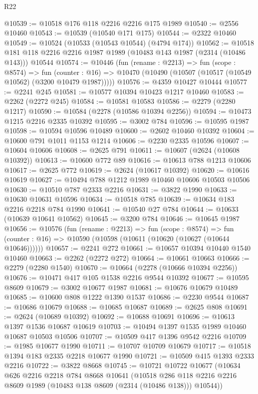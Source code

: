 \begin{lexlean}{R22}
\begin{coremodule}
@10539 := @10518 @176 @118 @2216 @2216 @175 @1989
@10540 := @2556 @10460
@10543 := @10539 (@10540 @171 @175)
@10544 := @2322 @10460
@10549 := @10524 (@10533 (@10543 @10544) (@4794 @174))
@10562 := @10518 @181 @118 @2216 @2216 @1987 @1989 (@10483 @143 @1987 (@2314 (@10486 @143))) @10544
@10574 := @10446
    (fun (rename : @2213) =>
    fun (scope : @8574) =>
    fun (counter : @16) => @10470 (@10490 (@10507 (@10517 (@10549 @10562) (@3200 @10479 @1987)))))
@10576 := @4359 @10427 @10444
@10577 := @2241 @245
@10581 := @10577 @10394 @10423 @1217 @10460
@10583 := @2262 (@2272 @245)
@10584 := @10581 @10583
@10586 := @2279 (@2280 @1217)
@10590 := @10584 (@2278 (@10586 @10394 @2256))
@10594 := @10473 @1215 @2216 @2335 @10392
@10595 := @3002 @784
@10596 := @10595 @1987
@10598 := @10594 @10596 @10489
@10600 := @2602 @10460 @10392
@10604 := @10600 @791 @1011 @1153 @1214
@10606 := @2230 @2335 @10596
@10607 := @10604 @10606
@10608 := @2625 @791
@10611 := @10607 (@2624 (@10608 @10392))
@10613 := @10600 @772 @89
@10616 := @10613 @788 @1213 @10606
@10617 := @2625 @772
@10619 := @2624 (@10617 @10392)
@10620 := @10616 @10619
@10627 := @10494 @788 @1212 @1989 @10460 @10606 @10503 @10506
@10630 := @10510 @787 @2333 @2216
@10631 := @3822 @1990
@10633 := @10630 @10631 @10596
@10634 := @10518 @785
@10639 := @10634 @183 @2216 @2218 @784 @1990
@10641 := @10540 @27 @784
@10644 := @10633 (@10639 @10641 @10562)
@10645 := @3200 @784
@10646 := @10645 @1987
@10656 := @10576
    (fun (rename : @2213) =>
    fun (scope : @8574) =>
    fun (counter : @16) => @10590 (@10598 (@10611 (@10620 (@10627 (@10644 @10646))))))
@10657 := @2241 @272
@10661 := @10657 @10394 @10440 @1540 @10460
@10663 := @2262 (@2272 @272)
@10664 := @10661 @10663
@10666 := @2279 (@2280 @1540)
@10670 := @10664 (@2278 (@10666 @10394 @2256))
@10676 := @10471 @417 @105 @1538 @2216 @9544 @10392
@10677 := @10595 @8609
@10679 := @3002 @10677 @1987
@10681 := @10676 @10679 @10489
@10685 := @10600 @808 @1222 @1390 @1537
@10686 := @2230 @9544
@10687 := @10686 @10679
@10688 := @10685 @10687
@10689 := @2625 @808
@10691 := @2624 (@10689 @10392)
@10692 := @10688 @10691
@10696 := @10613 @1397 @1536 @10687 @10619
@10703 := @10494 @1397 @1535 @1989 @10460 @10687 @10503 @10506
@10707 := @10509 @417 @1396 @9542 @2216
@10709 := @1985 @10677 @1990
@10711 := @10707 @10709 @10679
@10717 := @10518 @1394 @183 @2335 @2218 @10677 @1990
@10721 := @10509 @415 @1393 @2333 @2216
@10722 := @3822 @8668
@10745 := @10721
    @10722
    @10677
    (@10634
      @626
      @2216
      @2218
      @784
      @8668
      @10641
      (@10518 @286 @118 @2216 @2216 @8609 @1989 (@10483 @138 @8609 (@2314 (@10486 @138))) @10544))

\end{coremodule}
\end{lexlean}
